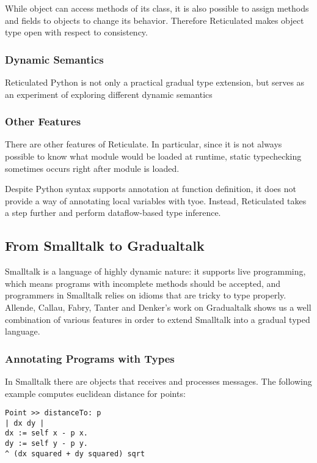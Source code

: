 While object can access methods of its class, it is also possible
to assign methods and fields to objects to change its behavior.
Therefore Reticulated makes object type open with respect to consistency.

\subsubsection{Dynamic Semantics}

Reticulated Python is not only a practical gradual type extension,
but serves as an experiment of exploring different dynamic semantics

\subsubsection{Other Features}

There are other features of Reticulate.
In particular, since it is not always possible to know what module would be loaded
at runtime, static typechecking sometimes occurs right after module is loaded.

Despite Python syntax supports annotation at function definition,
it does not provide a way of annotating local variables with tyoe.
Instead, Reticulated takes a step further and perform dataflow-based type inference.


\subsection{From Smalltalk to Gradualtalk}

Smalltalk is a language of highly dynamic nature:
it supports live programming, which means programs with incomplete
methods should be accepted, and programmers in Smalltalk relies on
idioms that are tricky to type properly.
Allende, Callau, Fabry, Tanter and Denker's work on Gradualtalk shows
us a well combination of various features in order to extend Smalltalk
into a gradual typed language.

\subsubsection{Annotating Programs with Types}

In Smalltalk there are objects that receives and processes messages.
The following example computes euclidean distance for points:

\begin{verbatim}
Point >> distanceTo: p
| dx dy |
dx := self x - p x.
dy := self y - p y.
^ (dx squared + dy squared) sqrt
\end{verbatim}

